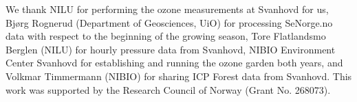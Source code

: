 \documentclass[bg, manuscript]{copernicus}
\begin{document}
\begin{acknowledgements}
  We thank NILU for performing the ozone measurements at Svanhovd for us, Bj{\o}rg Rognerud (Department of Geosciences, UiO) for processing SeNorge.no data with respect to the beginning of the growing season, Tore Flatlandsmo Berglen (NILU) for hourly pressure data from Svanhovd, NIBIO Environment Center Svanhovd for establishing and running the ozone garden both years, and Volkmar Timmermann (NIBIO) for sharing ICP Forest data from Svanhovd. This work was supported by the Research Council of Norway (Grant No. 268073).
\end{acknowledgements}

















\end{document}
